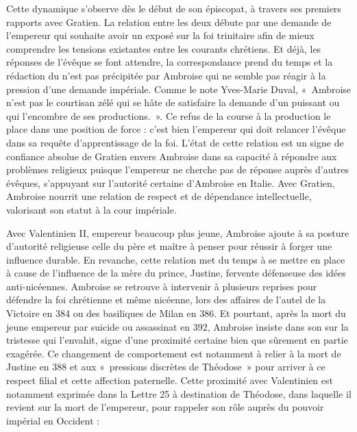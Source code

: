 Cette dynamique s'observe dès le début de son épiscopat, à travers ses premiers rapports avec Gratien. La relation entre les deux débute par une demande de l'empereur qui souhaite avoir un exposé sur la foi trinitaire afin de mieux comprendre les tensions existantes entre les courants chrétiens. Et déjà, les réponses de l'évêque se font attendre, la correspondance prend du temps et la rédaction du  n'est pas précipitée par Ambroise qui ne semble pas réagir à la pression d'une demande impériale. Comme le note Yves-Marie Duval, «~Ambroise n’est pas le courtisan zélé qui se hâte de satisfaire la demande d’un puissant ou qui l’encombre de ses productions.\autocite[223]{duval_lettres_gratien}~». Ce refus de la course à la production le place dans une position de force : c'est bien l'empereur qui doit relancer l'évêque dans sa requête d'apprentissage de la foi. L'état de cette relation est un signe de confiance absolue de Gratien envers Ambroise dans sa capacité à répondre aux problèmes religieux puisque l'empereur ne cherche pas de réponse auprès d'autres évêques, s'appuyant sur l'autorité certaine d'Ambroise en Italie. Avec Gratien, Ambroise nourrit une relation de respect et de dépendance intellectuelle, valorisant son statut à la cour impériale.

\bigskip

Avec Valentinien II, empereur beaucoup plus jeune, Ambroise ajoute à sa posture d'autorité religieuse celle du père et maître à penser pour réussir à forger une influence durable. En revanche, cette relation met du temps à se mettre en place à cause de l'influence de la mère du prince, Justine, fervente défenseuse des idées anti-nicéennes. Ambroise se retrouve à intervenir à plusieurs reprises pour défendre la foi chrétienne et même nicéenne, lors des affaires de l'autel de la Victoire en 384 ou des basiliques de Milan en 386. Et pourtant, après la mort du jeune empereur par suicide ou assassinat en 392, Ambroise insiste dans son  sur la tristesse qui l'envahit, signe d'une proximité certaine bien que sûrement en partie exagérée. Ce changement de comportement est notamment à relier à la mort de Justine en 388 et aux «~pressions discrètes de Théodose~» pour arriver à ce respect filial et cette affection paternelle\autocite[Introduction]{ambroise_mort_valentinien}. Cette proximité avec Valentinien est notamment exprimée dans la Lettre 25 à destination de Théodose, dans laquelle il revient sur la mort de l'empereur, pour rappeler son rôle auprès du pouvoir impérial en Occident :

